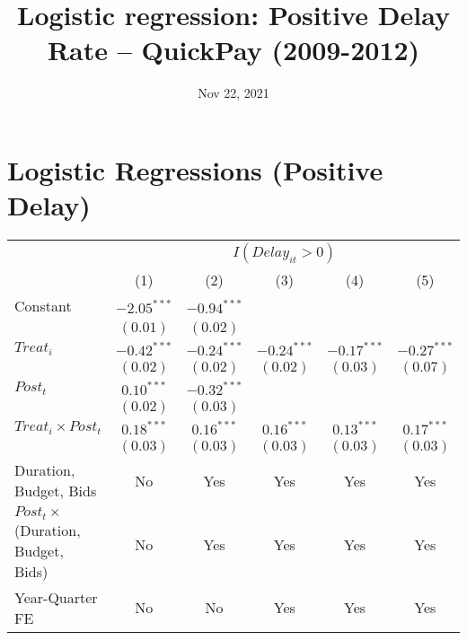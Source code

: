 \documentclass[
]{article}
\title{Logistic regression: Positive Delay Rate -- QuickPay (2009-2012)}
\author{}
\date{\vspace{-2.5em}Nov 22, 2021}
\begin{document}
\maketitle

\hypertarget{logistic-regressions-positive-delay}{%
\section{Logistic Regressions (Positive
Delay)}\label{logistic-regressions-positive-delay}}

\begin{table}
\begin{center}
\begin{tabular}{l c c c c c}
\hline
 & \multicolumn{5}{c}{$I(Delay_{it}>0)$} \\
\cline{2-6}
 & (1) & (2) & (3) & (4) & (5) \\
\hline
Constant                                   & $-2.05^{***}$ & $-0.94^{***}$ &               &               &               \\
                                           & $(0.01)$      & $(0.02)$      &               &               &               \\
$Treat_i$                                  & $-0.42^{***}$ & $-0.24^{***}$ & $-0.24^{***}$ & $-0.17^{***}$ & $-0.27^{***}$ \\
                                           & $(0.02)$      & $(0.02)$      & $(0.02)$      & $(0.03)$      & $(0.07)$      \\
$Post_t$                                   & $0.10^{***}$  & $-0.32^{***}$ &               &               &               \\
                                           & $(0.02)$      & $(0.03)$      &               &               &               \\
$Treat_i \times Post_t$                    & $0.18^{***}$  & $0.16^{***}$  & $0.16^{***}$  & $0.13^{***}$  & $0.17^{***}$  \\
                                           & $(0.03)$      & $(0.03)$      & $(0.03)$      & $(0.03)$      & $(0.03)$      \\
\hline
Duration, Budget, Bids                     & No            & Yes           & Yes           & Yes           & Yes           \\
$Post_t \times $  (Duration, Budget, Bids) & No            & Yes           & Yes           & Yes           & Yes           \\
Year-Quarter FE                            & No            & No            & Yes           & Yes           & Yes           \\

\end{tabular}
\end{center}
\end{table}
\end{document}
